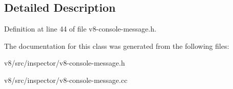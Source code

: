 \subsection{Detailed Description}


Definition at line 44 of file v8-\/console-\/message.\+h.



The documentation for this class was generated from the following files\+:\begin{DoxyCompactItemize}
\item 
v8/src/inspector/v8-\/console-\/message.\+h\item 
v8/src/inspector/v8-\/console-\/message.\+cc\end{DoxyCompactItemize}

